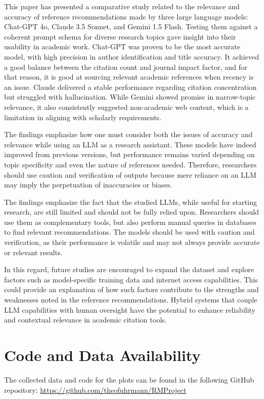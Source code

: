 \documentclass[runningheads]{llncs}
\begin{document}
%

This paper has presented a comparative study related to the relevance and accuracy of reference recommendations made by three large language models: Chat-GPT 4o, Claude 3.5 Sonnet, and Gemini 1.5 Flash. Testing them against a coherent prompt schema for diverse research topics gave insight into their usability in academic work. Chat-GPT was proven to be the most accurate model, with high precision in author identification and title accuracy. It achieved a good balance between the citation count and journal impact factor, and for that reason, it is good at sourcing relevant academic references when recency is an issue. Claude delivered a stable performance regarding citation concentration but struggled with hallucination. While Gemini showed promise in narrow-topic relevance, it also consistently suggested non-academic web content, which is a limitation in aligning with scholarly requirements.

The findings emphasize how one must consider both the issues of accuracy and relevance while using an LLM as a research assistant. These models have indeed improved from previous versions, but performance remains varied depending on topic specificity and even the nature of references needed. Therefore, researchers should use caution and verification of outputs because mere reliance on an LLM may imply the perpetuation of inaccuracies or biases.

The findings emphasize the fact that the studied LLMs, while useful for starting research, are still limited and should not be fully relied upon. Researchers should use them as complementary tools, but also perform manual queries in databases to find relevant recommendations. The models should be used with caution and verification, as their performance is volatile and may not always provide accurate or relevant results.

In this regard, future studies are encouraged to expand the dataset and explore factors such as model-specific training data and internet access capabilities. This could provide an explanation of how such factors contribute to the strengths and weaknesses noted in the reference recommendations. Hybrid systems that couple LLM capabilities with human oversight have the potential to enhance reliability and contextual relevance in academic citation tools.

\section*{Code and Data Availability}
The collected data and code for the plots can be found in the following GitHub repository: \url{https://github.com/theofuhrmann/RMProject}

\end{document}
